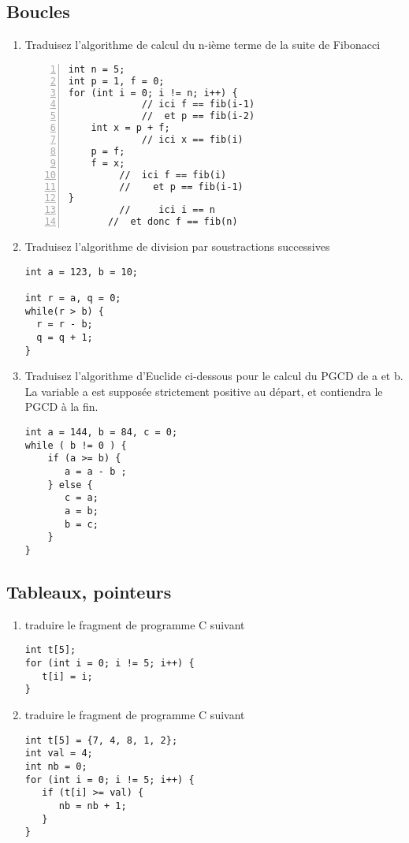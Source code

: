 \documentclass[10pt]{article}
\begin{document}
\begin{multicols*}{2}
\subsection{Boucles}

\begin{enumerate}
\item Traduisez l'algorithme de  calcul du n-ième terme de la 
suite de Fibonacci
\begin{lstlisting}[frame=single, numbers=left]
int n = 5;
int p = 1, f = 0;
for (int i = 0; i != n; i++) {
             // ici f == fib(i-1)
             //  et p == fib(i-2)
    int x = p + f;
             // ici x == fib(i)
    p = f;
    f = x;
         //  ici f == fib(i)
         //    et p == fib(i-1)
}
         //     ici i == n 
       //  et donc f == fib(n)
\end{lstlisting}


\item Traduisez l'algorithme de division par soustractions successives
\begin{lstlisting}[frame=single]
int a = 123, b = 10;

int r = a, q = 0;
while(r > b) {
  r = r - b;
  q = q + 1;
}
\end{lstlisting}

\item Traduisez l'algorithme d'Euclide ci-dessous pour le calcul
du PGCD de a et b. La variable a est supposée strictement positive au
départ, et contiendra le PGCD à la fin.
\begin{lstlisting}[frame=single]
int a = 144, b = 84, c = 0;
while ( b != 0 ) {
    if (a >= b) {
       a = a - b ;
    } else {
       c = a;
       a = b;
       b = c;
    } 
}
\end{lstlisting}
\end{enumerate}

\subsection{Tableaux, pointeurs}

\begin{enumerate}
  \item traduire le fragment de programme C suivant
\begin{lstlisting}[frame=single]
int t[5];
for (int i = 0; i != 5; i++) {
   t[i] = i;
}
\end{lstlisting}

  \item traduire le fragment de programme C suivant
\begin{lstlisting}[frame=single]
int t[5] = {7, 4, 8, 1, 2};
int val = 4;
int nb = 0;
for (int i = 0; i != 5; i++) {
   if (t[i] >= val) {
      nb = nb + 1;
   }
}
\end{lstlisting}


\end{enumerate}
\end{multicols*}
\end{document}
